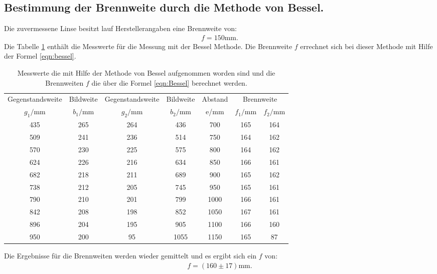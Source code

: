 \subsection{Bestimmung der Brennweite durch die Methode von Bessel.}
Die zuvermessene Linse besitzt lauf Herstellerangaben eine Brennweite von:
\begin{align*}
  f=150\si{\milli\meter}.
\end{align*}
Die Tabelle \ref{tab:bessel} enthält die Messwerte für die Messung mit der Bessel Methode.
Die Brennweite $f$ errechnet sich bei dieser Methode mit Hilfe der Formel \ref{eqn:bessel}.
\begin{table}
    \centering
    \caption{Messwerte die mit Hilfe der Methode von Bessel aufgenommen worden sind
    und die Brennweiten $f$ die über die Formel \eqref{eqn:Bessel} berechnet werden.}
    \label{tab:bessel}
    \begin{tabular}{c c c c c c c}
    \toprule
    Gegenstandsweite   & Bildweite &  Gegenstandsweite   & Bildweite & Abstand  & \multicolumn{2}{c}{Brennweite}\\
    $g_1/\si{\milli\meter}$ & $b_1/\si{\milli\meter}$ &$g_2/\si{\milli\meter}$ & $b_2/\si{\milli\meter}$ & e/\si{\milli\meter} & $f_1/\si{\milli\meter}$ & $f_2/\si{\milli\meter}$\\
    \midrule
  435  &   265 &   264 &   436  & 700  & 165 & 164 \\
  509  &   241 &   236 &   514  & 750  & 164 & 162 \\
  570  &   230 &   225 &   575  & 800  & 164 & 162 \\
  624  &   226 &   216 &   634  & 850  & 166 & 161 \\
  682  &   218 &   211 &   689  & 900  & 165 & 162 \\
  738  &   212 &   205 &   745  & 950  & 165 & 161 \\
  790  &   210 &   201 &   799  & 1000 & 166 & 161 \\
  842  &   208 &   198 &   852  & 1050 & 167 & 161 \\
  896  &   204 &   195 &   905  & 1100 & 166 & 160 \\
  950  &   200 &    95 &   1055 & 1150 & 165 & 87  \\
  \bottomrule
\end{tabular}
\end{table}
\FloatBarrier
Die Ergebnisse für die Brennweiten
werden wieder gemittelt und es ergibt sich ein $f$ von:
\begin{align*}
  f=(160\pm17)\si{\milli\meter}.
\end{align*}

